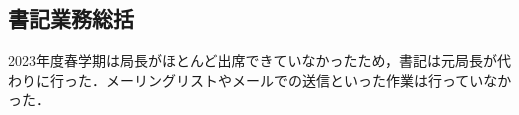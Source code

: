 \subsection*{書記業務総括}

2023年度春学期は局長がほとんど出席できていなかったため，書記は元局長が代わりに行った．メーリングリストやメールでの送信といった作業は行っていなかった．


